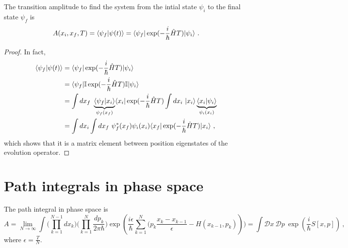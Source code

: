     The transition amplitude to find the system from the intial state $\psi_i$ to the final state $\psi_f$ is 
    \begin{equation*}
        A(x_i, x_f, T) = \langle\psi_f\vert\psi(t)\rangle = \langle\psi_f\vert \exp(- \frac{i}{\hbar} \hat H T) \vert\psi_i\rangle ~.
    \end{equation*}
    \begin{proof}
        In fact, 
        \begin{equation*}
        \begin{aligned}
            \langle\psi_f\vert\psi(t)\rangle & = \langle\psi_f\vert \exp(- \frac{i}{\hbar} \hat H T) \vert\psi_i\rangle \\ & = \langle\psi_f\vert \mathbb I \exp(- \frac{i}{\hbar} \hat H T) \mathbb I \vert\psi_i\rangle \\ & = \int dx_f ~ \underbrace{\langle\psi_f\vert x_i\rangle}_{\psi_f(x_f)} \langle x_i\vert \exp(- \frac{i}{\hbar} \hat H T) \int dx_i ~ \vert x_i\rangle \underbrace{\langle x_i\vert\psi_i\rangle}_{\psi_i(x_i)} \\ & = \int dx_i \int dx_f ~ \psi_f^* (x_f) \psi_i (x_i) \langle x_f\vert \exp(- \frac{i}{\hbar} \hat H T) \vert x_i\rangle ~,
        \end{aligned}
        \end{equation*}
        which shows that it is a matrix element between position eigenstates of the evolution operator.
    \end{proof}

\chapter{Path integrals in phase space}

    The path integral in phase space is 
    \begin{equation*}
        A = \lim_{N \rightarrow \infty} \int \Big (\prod_{k=1}^{N-1} d x_k \Big ) \Big (\prod_{k=1}^{N} \frac{d p_k}{2\pi \hbar} \Big ) \exp(\frac{i \epsilon}{\hbar} \sum_{k=1}^{N} \Big (p_k \frac{x_k - x_{k-1}}{\epsilon} - H(x_{k-1}, p_k))) = \int \mathcal D x ~ \mathcal D p ~ \exp(\frac{i}{\hbar} S[x,p]) ~,
    \end{equation*}
    where $\epsilon =\frac{T}{N} $.

